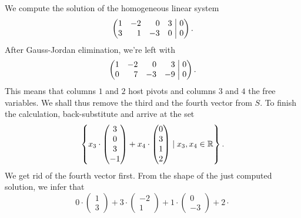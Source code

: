 \begin{probsol}
 We compute the solution of the homogeneous linear system
 \[
  \left(
   \begin{matrix*}[r]
    1 & -2 & 0 & 3\\
    3 & 1 & -3 & 0
   \end{matrix*}
   \hspace{1mm}
  \right|
  \left.
   \begin{matrix*}[r]
    0\\
    0
   \end{matrix*}
  \right).
 \]
 After Gauss-Jordan elimination, we're left with
 \[
  \left(
   \begin{matrix*}[r]
    1 & -2 & 0 & 3\\
    0 & 7 & -3 & -9
   \end{matrix*}
   \hspace{1mm}
  \right|
  \left.
   \begin{matrix*}[r]
    0\\
    0
   \end{matrix*}
  \right).
 \]
 This means that columns $1$ and $2$ host pivots and columns $3$ and $4$ the
 free variables. We shall thus remove the third and the fourth vector from $S$.
 To finish the calculation, back-substitute and arrive at the set
 \[
  \left\{ x_3 \cdot 
   \begin{pmatrix}
    3\\
    0\\
    3\\
    -1
   \end{pmatrix}
   + x_4 \cdot 
   \begin{pmatrix}
    0\\
    3\\
    1\\
    2
   \end{pmatrix} \mid x_3,x_4 \in \mathbb{R}
  \right\}.
 \]
 We get rid of the fourth vector first. From the shape of the just computed
 solution, we infer that
 \[
  0 \cdot 
  \begin{pmatrix}
   1\\
   3
  \end{pmatrix}
  + 3 \cdot 
  \begin{pmatrix}
   -2\\
   1
  \end{pmatrix}
  + 1 \cdot 
  \begin{pmatrix}
   0\\
   -3
  \end{pmatrix}
  + 2 \cdot 
\]
\end{probsol}
